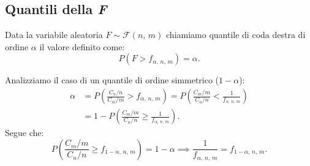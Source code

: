         \subsection{Quantili della \textit{F}}
            \begin{defn}
                Data la variabile aleatoria $F \sim \mathcal{F}(n,\,m)$ chiamiamo quantile di coda destra 
                di ordine $\alpha$ il valore definito come: \[
                    P(F > f_{\alpha,\,n,\,m}) = \alpha
                .\]
            \end{defn}
            \begin{obsv}
                Analizziamo il caso di un quantile di ordine simmetrico ($1-\alpha$):
                \begin{align*}
                    \alpha &= P\left(\frac{C_n /n}{C_m /m} > f_{\alpha,\,n,\,m}\right) =
                    P\left(\frac{C_m /m}{C_n /n} < \frac{1}{f_{\alpha,\,n,\,m}}\right) \\
                           &= 1 - P\left(\frac{C_m /m}{C_n /n} \geq \frac{1}{f_{\alpha,\,n,\,m}}\right)
                .\end{align*}
                Segue che:
                \begin{equation}\label{eq:Simmetria_quantile_distribuzione_F}
                    P\left(\frac{C_m /m}{C_n /n} \geq f_{1-\alpha,\,n,\,m}\right) = 1-\alpha \implies
                    \frac{1}{f_{\alpha,\,n,\,m}} = f_{1-\alpha,\,n,\,m}
                .\end{equation}
            \end{obsv}

